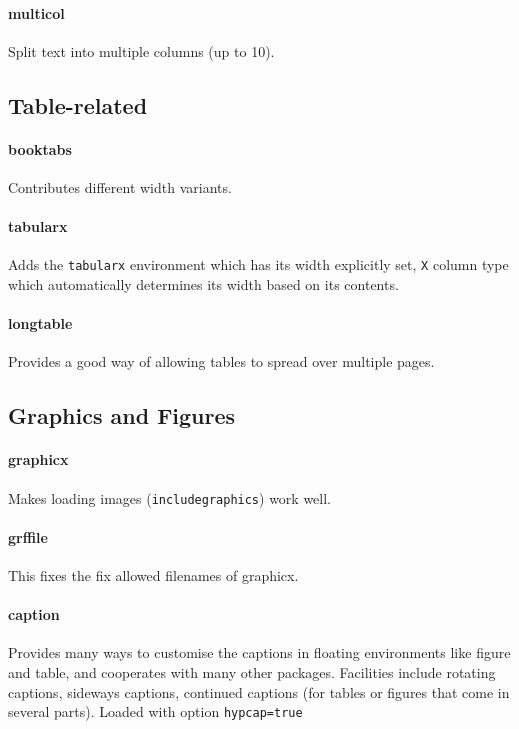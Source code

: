 \documentclass[solid,math,chem,code,plot,gloss]{bmc}
\begin{document}
\paragraph{\ttfamily multicol}\label{par:multicol}
Split text into multiple columns (up to 10).

\subsection{Table-related}

\paragraph{\ttfamily booktabs}\label{par:booktabs}
Contributes different width \texttt{\hline} variants.
\paragraph{\ttfamily tabularx}\label{par:tabularx}
Adds the \texttt{tabularx} environment which has its width explicitly set,
\texttt{X} column type which automatically determines its width based on its contents.
\paragraph{\ttfamily longtable}\label{par:longtable}
Provides a good way of allowing tables to spread over multiple pages.

\subsection{Graphics and Figures}

\paragraph{\ttfamily graphicx}\label{par:graphicx}
Makes loading images (\texttt{includegraphics}) work well.
\paragraph{\ttfamily grffile}\label{par:grffile}
This fixes the fix allowed filenames of graphicx.
\paragraph{\ttfamily caption}\label{par:caption}
Provides many ways to customise the captions in floating environments like figure and table,
and cooperates with many other packages.
Facilities include rotating captions, sideways captions, continued captions (for tables or figures that come in several parts).
Loaded with option \texttt{hypcap=true}
\end{document}
